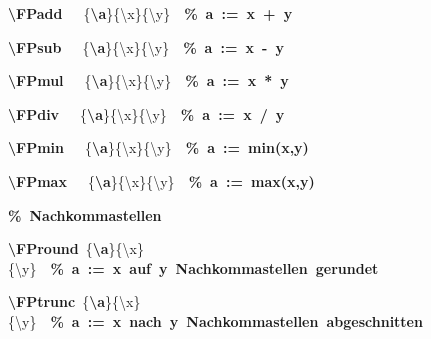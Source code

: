 {{\rule[-0.5ex]{0pt}{2.5ex}\hspace*{0.0em}\textcolor{R}{\textbf{\textbackslash{}FPadd}}~~~\{\textcolor{B}{\textbf{\textbackslash{}a}}\}\{\textbackslash{}x\}\{\textbackslash{}y\}~~\textcolor{G}{\textbf{\%~a~:=~x~+~y}}\\
\rule[-0.5ex]{0pt}{2.5ex}\hspace*{0.0em}\textcolor{R}{\textbf{\textbackslash{}FPsub}}~~~\{\textcolor{B}{\textbf{\textbackslash{}a}}\}\{\textbackslash{}x\}\{\textbackslash{}y\}~~\textcolor{G}{\textbf{\%~a~:=~x~{-}~y}}\\
\rule[-0.5ex]{0pt}{2.5ex}\hspace*{0.0em}\textcolor{R}{\textbf{\textbackslash{}FPmul}}~~~\{\textcolor{B}{\textbf{\textbackslash{}a}}\}\{\textbackslash{}x\}\{\textbackslash{}y\}~~\textcolor{G}{\textbf{\%~a~:=~x~*~y}}\\
\rule[-0.5ex]{0pt}{2.5ex}\hspace*{0.0em}\textcolor{R}{\textbf{\textbackslash{}FPdiv}}~~~\{\textcolor{B}{\textbf{\textbackslash{}a}}\}\{\textbackslash{}x\}\{\textbackslash{}y\}~~\textcolor{G}{\textbf{\%~a~:=~x~/~y}}\\
\rule[-0.5ex]{0pt}{2.5ex}\hspace*{0.0em}\textcolor{R}{\textbf{\textbackslash{}FPmin}}~~~\{\textcolor{B}{\textbf{\textbackslash{}a}}\}\{\textbackslash{}x\}\{\textbackslash{}y\}~~\textcolor{G}{\textbf{\%~a~:=~min(x,y)}}\\
\rule[-0.5ex]{0pt}{2.5ex}\hspace*{0.0em}\textcolor{R}{\textbf{\textbackslash{}FPmax}}~~~\{\textcolor{B}{\textbf{\textbackslash{}a}}\}\{\textbackslash{}x\}\{\textbackslash{}y\}~~\textcolor{G}{\textbf{\%~a~:=~max(x,y)}}\\
\rule[-0.5ex]{0pt}{2.5ex}\hspace*{0.0em}\textcolor{G}{\textbf{\%~Nachkommastellen}}\\
\rule[-0.5ex]{0pt}{2.5ex}\hspace*{0.0em}\textcolor{R}{\textbf{\textbackslash{}FPround}}~\{\textcolor{B}{\textbf{\textbackslash{}a}}\}\{\textbackslash{}x\}\{\textbackslash{}y\}~~\textcolor{G}{\textbf{\%~a~:=~x~auf~y~Nachkommastellen~gerundet}}\\
\rule[-0.5ex]{0pt}{2.5ex}\hspace*{0.0em}\textcolor{R}{\textbf{\textbackslash{}FPtrunc}}~\{\textcolor{B}{\textbf{\textbackslash{}a}}\}\{\textbackslash{}x\}\{\textbackslash{}y\}~~\textcolor{G}{\textbf{\%~a~:=~x~nach~y~Nachkommastellen~abgeschnitten}}\\
}}
